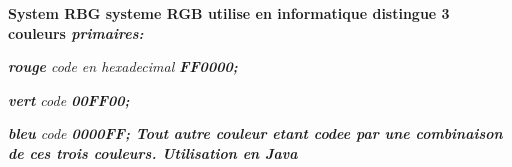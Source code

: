 \begindoc
\bf{System RBG}
\linebreak
\Le systeme \bf{RGB} utilise en informatique distingue 3 couleurs \it{primaires}:
\beginenum
\item \it{\bf{rouge}} code en hexadecimal \bf{FF0000};
\item \it{\bf{vert}} code \bf{00FF00};
\item \it{\bf{bleu}} code \bf{0000FF};
\endenum
Tout autre couleur etant codee par une combinaison de ces trois couleurs.
\linebreak
\linebreak
\bf{Utilisation en Java}
\enddoc
